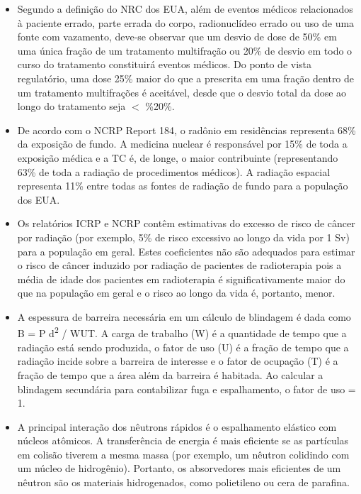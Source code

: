 \documentclass[11pt,a4paper]{article}
\newcounter{exemplo}
\begin{document}
\begin{exemplo}
\begin{itemize}
        \item Segundo a definição do NRC dos EUA, além de eventos médicos relacionados à paciente errado, parte errada do corpo, radionuclídeo errado ou uso de uma fonte com vazamento, deve-se observar que um desvio de dose de 50\% em uma única fração de um tratamento multifração ou 20\% de desvio em todo o curso do tratamento constituirá eventos médicos. Do ponto de vista regulatório, uma dose 25\% maior do que a prescrita em uma fração dentro de um tratamento multifrações é aceitável, desde que o desvio total da dose ao longo do tratamento seja $<$ \%20\%.
        
        \item De acordo com o NCRP Report 184, o radônio em residências representa 68\% da exposição de fundo. A medicina nuclear é responsável por 15\% de toda a exposição médica e a TC é, de longe, o maior contribuinte (representando 63\% de toda a radiação de procedimentos médicos). A radiação espacial representa 11\% entre todas as fontes de radiação de fundo para a população dos EUA.
        
        \item Os relatórios ICRP e NCRP contêm estimativas do excesso de risco de câncer por radiação (por exemplo, 5\% de risco excessivo ao longo da vida por 1 Sv) para a população em geral. Estes coeficientes não são adequados para estimar o risco de câncer induzido por radiação de pacientes de radioterapia pois a média de idade dos pacientes em radioterapia é significativamente maior do que na população em geral e o risco ao longo da vida é, portanto, menor.
        
        \item A espessura de barreira necessária em um cálculo de blindagem é dada como B = P d\textsuperscript{2} / WUT. A carga de trabalho (W) é a quantidade de tempo que a radiação está sendo produzida, o fator de uso (U) é a fração de tempo que a radiação incide sobre a barreira de interesse e o fator de ocupação (T) é a fração de tempo que a área além da barreira é habitada. Ao calcular a blindagem secundária para contabilizar fuga e espalhamento, o fator de uso = 1.
        
        \item A principal interação dos nêutrons rápidos é o espalhamento elástico com núcleos atômicos. A transferência de energia é mais eficiente se as partículas em colisão tiverem a mesma massa (por exemplo, um nêutron colidindo com um núcleo de hidrogênio). Portanto, os absorvedores mais eficientes de um nêutron são os materiais hidrogenados, como polietileno ou cera de parafina.
        
        
    \end{itemize}
\end{exemplo}
\end{document}
